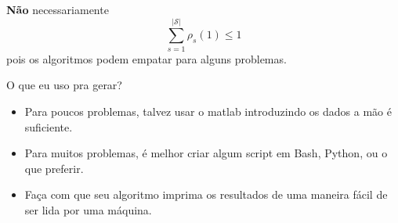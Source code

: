 \documentclass[10pt]{beamer}
\newcommand{\myframe}[1]{
\begin{frame}

{#1}

\end{frame}}
\begin{document}
\myframe{
  {\bf Não} necessariamente 
  $$\sum_{s=1}^{|\mathcal{S}|}\rho_s(1) \leq 1$$
  pois os algoritmos podem empatar para alguns problemas.
  \pause

  O que eu uso pra gerar?
  \begin{itemize}
    \item<2-> Para poucos problemas, talvez usar o matlab introduzindo os dados a
      mão é suficiente.
    \item<3-> Para muitos problemas, é melhor criar algum script em Bash,
      Python, ou o que preferir.
    \item<4-> Faça com que seu algoritmo imprima os resultados de uma maneira
      fácil de ser lida por uma máquina.
  \end{itemize}
}
\end{document}

